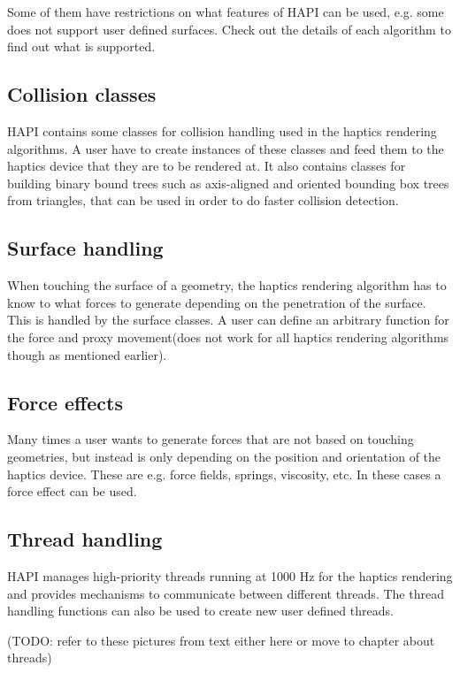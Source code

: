 Some of them have restrictions on what features of HAPI can be used,
e.g. some does not support user defined surfaces. Check out the
details of each algorithm to find out what is supported.

\subsection{Collision classes}
HAPI contains some classes for collision handling used in the
haptics rendering algorithms. A user have to create instances of these
classes and feed them to the haptics device that they are to be
rendered at. It also contains classes for building binary bound trees
such as axis-aligned and oriented bounding box trees from triangles,
that can be used in order to do faster collision detection. 

\subsection{Surface handling}
When touching the surface of a geometry, the haptics rendering
algorithm has to know to what forces to generate depending on the
penetration of the surface. This is handled by the surface classes. A
user can define an arbitrary function for the force and proxy
movement(does not work for all haptics rendering algorithms though as
mentioned earlier).

\subsection{Force effects}
Many times a user wants to generate forces that are not based on
touching geometries, but instead is only depending on the position and
orientation of the haptics device. These are e.g. force fields,
springs, viscosity, etc. In these cases a force effect can be used.

\subsection{Thread handling}
HAPI manages high-priority threads running at 1000 Hz for the haptics
rendering and provides mechanisms to communicate between different
threads. The thread handling functions can also be used to create new
user defined threads.      

(TODO: refer to these pictures from text either here or move to chapter about threads)

